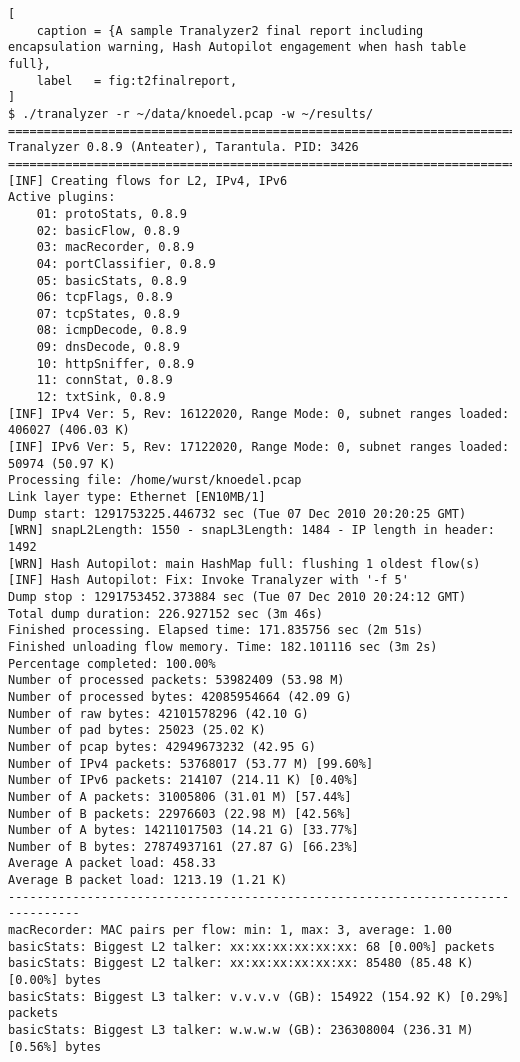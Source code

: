 \begin{lstlisting}[
    caption = {A sample Tranalyzer2 final report including encapsulation warning, Hash Autopilot engagement when hash table full},
    label   = fig:t2finalreport,
]
$ ./tranalyzer -r ~/data/knoedel.pcap -w ~/results/
================================================================================
Tranalyzer 0.8.9 (Anteater), Tarantula. PID: 3426
================================================================================
[INF] Creating flows for L2, IPv4, IPv6
Active plugins:
    01: protoStats, 0.8.9
    02: basicFlow, 0.8.9
    03: macRecorder, 0.8.9
    04: portClassifier, 0.8.9
    05: basicStats, 0.8.9
    06: tcpFlags, 0.8.9
    07: tcpStates, 0.8.9
    08: icmpDecode, 0.8.9
    09: dnsDecode, 0.8.9
    10: httpSniffer, 0.8.9
    11: connStat, 0.8.9
    12: txtSink, 0.8.9
[INF] IPv4 Ver: 5, Rev: 16122020, Range Mode: 0, subnet ranges loaded: 406027 (406.03 K)
[INF] IPv6 Ver: 5, Rev: 17122020, Range Mode: 0, subnet ranges loaded: 50974 (50.97 K)
Processing file: /home/wurst/knoedel.pcap
Link layer type: Ethernet [EN10MB/1]
Dump start: 1291753225.446732 sec (Tue 07 Dec 2010 20:20:25 GMT)
[WRN] snapL2Length: 1550 - snapL3Length: 1484 - IP length in header: 1492
[WRN] Hash Autopilot: main HashMap full: flushing 1 oldest flow(s)
[INF] Hash Autopilot: Fix: Invoke Tranalyzer with '-f 5'
Dump stop : 1291753452.373884 sec (Tue 07 Dec 2010 20:24:12 GMT)
Total dump duration: 226.927152 sec (3m 46s)
Finished processing. Elapsed time: 171.835756 sec (2m 51s)
Finished unloading flow memory. Time: 182.101116 sec (3m 2s)
Percentage completed: 100.00%
Number of processed packets: 53982409 (53.98 M)
Number of processed bytes: 42085954664 (42.09 G)
Number of raw bytes: 42101578296 (42.10 G)
Number of pad bytes: 25023 (25.02 K)
Number of pcap bytes: 42949673232 (42.95 G)
Number of IPv4 packets: 53768017 (53.77 M) [99.60%]
Number of IPv6 packets: 214107 (214.11 K) [0.40%]
Number of A packets: 31005806 (31.01 M) [57.44%]
Number of B packets: 22976603 (22.98 M) [42.56%]
Number of A bytes: 14211017503 (14.21 G) [33.77%]
Number of B bytes: 27874937161 (27.87 G) [66.23%]
Average A packet load: 458.33
Average B packet load: 1213.19 (1.21 K)
--------------------------------------------------------------------------------
macRecorder: MAC pairs per flow: min: 1, max: 3, average: 1.00
basicStats: Biggest L2 talker: xx:xx:xx:xx:xx:xx: 68 [0.00%] packets
basicStats: Biggest L2 talker: xx:xx:xx:xx:xx:xx: 85480 (85.48 K) [0.00%] bytes
basicStats: Biggest L3 talker: v.v.v.v (GB): 154922 (154.92 K) [0.29%] packets
basicStats: Biggest L3 talker: w.w.w.w (GB): 236308004 (236.31 M) [0.56%] bytes

\end{lstlisting}
